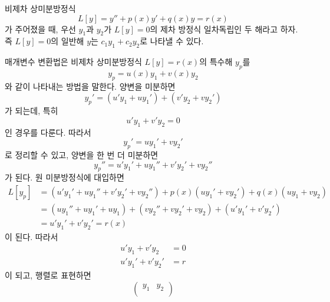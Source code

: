 \documentclass[../engineering_mathematics_lecture_note.tex]{subfiles}
\begin{document}
\begin{example}
    비제차 상미분방정식
    \begin{equation*}
        L[y] = y'' + p(x) y' + q(x) y = r(x)
    \end{equation*}
    가 주어졌을 때, 우선 $y_1$과 $y_2$가 $L[y] = 0$의 제차 방정식 일차독립인 두 해라고 하자.
    즉 $L[y] = 0$의 일반해 $y$는 $c_1 y_1 + c_2 y_2$로 나타낼 수 있다.
    
    매개변수 변환법은 비제차 상미분방정식 $L[y] = r(x)$의 특수해 $y_p$를
    \begin{equation*}
        y_p = u(x) y_1 + v(x) y_2
    \end{equation*}
    와 같이 나타내는 방법을 말한다.
    양변을 미분하면
    \begin{equation*}
        y_p' = \left( u' y_1 + u y_1' \right) + \left( v' y_2 + v y_2' \right)
    \end{equation*}
    가 되는데, 특히
    \begin{equation*}
        u' y_1 + v' y_2 = 0
    \end{equation*}
    인 경우를 다룬다.
    따라서
    \begin{equation*}
        y_p'= u y_1' + v y_2'
    \end{equation*}
    로 정리할 수 있고, 양변을 한 번 더 미분하면
    \begin{equation*}
        y_p'' = u' y_1' + u y_1'' + v' y_2' + v y_2''
    \end{equation*}
    가 된다.
    원 미분방정식에 대입하면
    \begin{align*}
        L[y_p] &= \left( u' y_1' + u y_1'' + v' y_2' + v y_2'' \right) + p(x) \left( uy_1' + vy_2' \right) + q(x) (u y_1 + v y_2)\\
               &= \left( u y_1'' + u y_1' + u y_1 \right) + \left( v y_2'' + v y_2' + v y_2 \right) + \left( u' y_1' + v' y_2' \right)\\
               &= u' y_1' + v' y_2' = r(x)
    \end{align*}
    이 된다.
    따라서
    \begin{align*}
        u' y_1 + v' y_2 &= 0\\
        u' y_1' + v' y_2' &= r
    \end{align*}
    이 되고, 행렬로 표현하면
    \begin{equation*}
        \begin{pmatrix}
            y_1 & y_2\\

\end{pmatrix}
\end{equation*}
\end{example}
\end{document}
